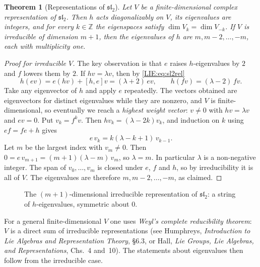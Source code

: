 \documentclass[11pt,openany]{book}
\theoremstyle{plain}
\newtheorem{theorem}{Theorem}[chapter]
\theoremstyle{definition}
\theoremstyle{remark}
\newcommand{\Z}{\mathbb{Z}}
\begin{document}
\begin{theorem}[Representations of $\mathfrak{sl}_2$]\label{LIE:thm:sl2}
Let $V$ be a finite-dimensional complex representation of $\mathfrak{sl}_2$. Then $h$ acts
diagonalizably on $V$, its eigenvalues are integers, and for every $k\in\Z$ the eigenspaces satisfy
$\dim V_k=\dim V_{-k}$. If $V$ is irreducible of dimension $m+1$, then the eigenvalues of $h$ are
$m,m-2,\dots,-m$, each with multiplicity one.
\end{theorem}

\begin{proof}[Proof for irreducible $V$]
The key observation is that $e$ raises $h$-eigenvalues by $2$ and $f$ lowers them by $2$. If
$hv=\lambda v$, then by \eqref{LIE:eq:sl2rel}
\[
  h(ev)=e(hv)+[h,e]v=(\lambda+2)\,ev,\qquad h(fv)=(\lambda-2)\,fv .
\]
Take any eigenvector of $h$ and apply $e$ repeatedly. The vectors obtained are eigenvectors for
distinct eigenvalues while they are nonzero, and $V$ is finite-dimensional, so eventually we reach a
\emph{highest weight vector}: $v\neq0$ with $hv=\lambda v$ and $ev=0$. Put $v_k=f^kv$. Then
$hv_k=(\lambda-2k)v_k$, and induction on $k$ using $ef=fe+h$ gives
\[
  e\,v_k=k(\lambda-k+1)\,v_{k-1}.
\]
Let $m$ be the largest index with $v_m\neq0$. Then $0=e\,v_{m+1}=(m+1)(\lambda-m)\,v_m$, so
$\lambda=m$. In particular $\lambda$ is a non-negative integer. The span of $v_0,\dots,v_m$ is closed
under $e$, $f$ and $h$, so by irreducibility it is all of $V$. The eigenvalues are therefore
$m,m-2,\dots,-m$, as claimed.
\end{proof}

\begin{figure}[ht]
\centering
{}
\caption{The $(m+1)$-dimensional irreducible representation of $\mathfrak{sl}_2$: a string of
$h$-eigenvalues, symmetric about $0$.}
\end{figure}

For a general finite-dimensional $V$ one uses \emph{Weyl's complete reducibility theorem}: $V$ is a
direct sum of irreducible representations (see Humphreys, \emph{Introduction to Lie Algebras and
Representation Theory}, \S6.3, or Hall, \emph{Lie Groups, Lie Algebras, and Representations}, Chs.~4 and~10).
The statements about eigenvalues then follow from the irreducible case.
\end{document}
